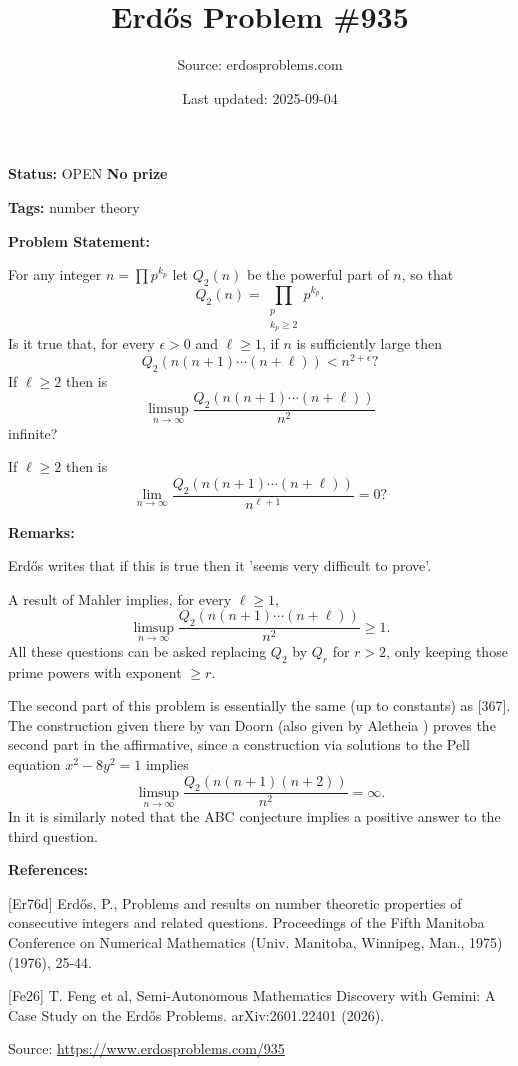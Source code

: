 \documentclass{article}
\title{Erd\H{o}s Problem \#935}
\date{Last updated: 2025-09-04}
\author{Source: erdosproblems.com}
\begin{document}
\maketitle

\noindent\textbf{Status:} OPEN \quad \textbf{No prize}

\noindent\textbf{Tags:} number theory

\medskip
\noindent\textbf{Problem Statement:}

For any integer $n=\prod p^{k_p}$ let $Q_2(n)$ be the powerful part of $n$, so that\[Q_2(n) = \prod_{\substack{p\\ k_p\geq 2}}p^{k_p}.\]Is it true that, for every $\epsilon>0$ and $\ell\geq 1$, if $n$ is sufficiently large then\[Q_2(n(n+1)\cdots(n+\ell))<n^{2+\epsilon}?\]If $\ell\geq 2$ then is\[\limsup_{n\to \infty}\frac{Q_2(n(n+1)\cdots(n+\ell))}{n^2}\]infinite? 

If $\ell\geq 2$ then is\[\lim_{n\to \infty}\frac{Q_2(n(n+1)\cdots(n+\ell))}{n^{\ell+1}}=0?\]

\bigskip
\noindent\textbf{Remarks:}

Erd\H{o}s \cite{Er76d} writes that if this is true then it 'seems very difficult to prove'. 

A result of Mahler implies, for every $\ell\geq 1$,\[\limsup_{n\to \infty}\frac{Q_2(n(n+1)\cdots(n+\ell))}{n^2}\geq 1.\]All these questions can be asked replacing $Q_2$ by $Q_r$ for $r>2$, only keeping those prime powers with exponent $\geq r$.

The second part of this problem is essentially the same (up to constants) as [367]. The construction given there by van Doorn (also given by Aletheia \cite{Fe26}) proves the second part in the affirmative, since a construction via solutions to the Pell equation $x^2-8y^2=1$ implies\[\limsup_{n\to \infty}\frac{Q_2(n(n+1)(n+2))}{n^2}=\infty.\]In \cite{Fe26} it is similarly noted that the ABC conjecture implies a positive answer to the third question.

\bigskip
\noindent\textbf{References:}

[Er76d] Erd\H{o}s, P., Problems and results on number theoretic properties of consecutive integers and related questions. Proceedings of the Fifth Manitoba Conference on Numerical Mathematics (Univ. Manitoba, Winnipeg, Man., 1975) (1976), 25-44.
 
 [Fe26] T. Feng et al, Semi-Autonomous Mathematics Discovery with Gemini: A Case Study on the Erd\H{o}s Problems. arXiv:2601.22401 (2026).

\bigskip
\noindent\small{Source: \url{https://www.erdosproblems.com/935}}
\end{document}

